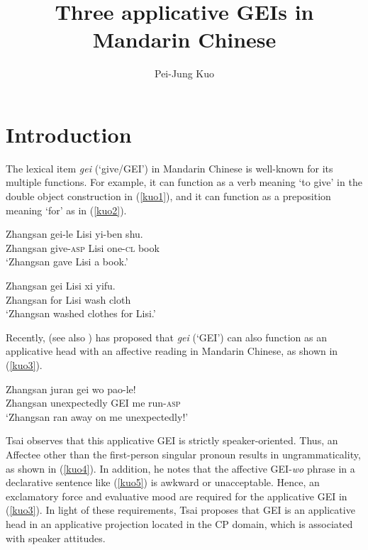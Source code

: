 \documentclass[output=paper,colorlinks,citecolor=brown]{langscibook}
\author{Pei-Jung Kuo\affiliation{National Chiayi University}}
\title{Three applicative GEIs in Mandarin Chinese}
\begin{document}
\maketitle

\section{Introduction} 
The lexical item \textit{gei} (`give/GEI') in Mandarin Chinese is well-known for its multiple functions. For example, it can function as a verb meaning `to give' in the double object construction in (\ref{kuo1}), and it can function as a preposition meaning `for' as in (\ref{kuo2}).


\ea
\label{kuo1}
\gll Zhangsan   gei-le              Lisi    yi-ben          shu.\\  
     Zhangsan   give-\textsc{asp}   Lisi    one-\textsc{cl} book\\ 
\glt `Zhangsan gave Lisi a book.'
\z

\ea
\label{kuo2}
\gll Zhangsan   gei Lisi    xi      yifu.\\  
     Zhangsan   for Lisi    wash    cloth \\ 
\glt `Zhangsan washed clothes for Lisi.'
\z

Recently, \citet{Tsai2017} (see also \citealt{Tsai2012, Tsai2015b}) has proposed that \textit{gei} (`GEI') can also function as an applicative head with an affective reading in Mandarin Chinese, as shown in (\ref{kuo3}). 

\ea
\label{kuo3}
\gll Zhangsan   juran           gei wo  pao-le!\\  
     Zhangsan   unexpectedly    GEI me  run-\textsc{asp}\\ 
\glt `Zhangsan ran away on me unexpectedly!'
\z

Tsai observes that this applicative GEI is strictly speaker-oriented. Thus, an Affectee other than the first-person singular pronoun results in ungrammaticality, as shown in (\ref{kuo4}). In addition, he notes that the affective GEI-\textit{wo} phrase in a declarative sentence like (\ref{kuo5}) is awkward or unacceptable. Hence, an exclamatory force and evaluative mood are required for the applicative GEI in (\ref{kuo3}). In light of these requirements, Tsai proposes that GEI is an applicative head in an applicative projection located in the CP domain, which is associated with speaker attitudes.

\z
\end{document}
